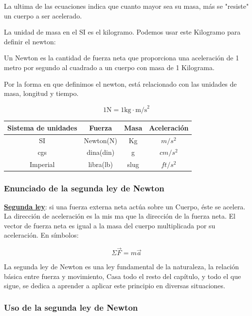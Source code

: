 \documentclass{article}
\newcommand{\newtitle}[1]{
    \color{titleColor}
    \subsubsection{#1}
    \color{black}
}
\newcommand{\bl}[1]{\textbf{#1}}
\newcommand{\definicion}[1]{%
    \vspace{0.5cm}
    \begin{definicionbox}
        #1
    \end{definicionbox}
    \vspace{0.5cm}
}
\begin{document}
    \par La ultima de las ecuaciones indica que cuanto mayor sea su masa, más se "resiste" un cuerpo a ser acelerado.
    \par La unidad de masa en el SI es el kilogramo. Podemos usar este Kilogramo para definir el newton:

    \definicion{
        \par Un Newton es la cantidad de fuerza neta que proporciona una aceleración de 1 metro por segundo al cuadrado a un cuerpo con masa de 1 Kilograma.
    }

    \par Por la forma en que definimos el newton, está relacionado con las unidades de masa, longitud y tiempo.

    \[ 1 \text{N} = 1 \text{kg} \cdot \text{m/s}^2 \]

    \begin{table}[H]
        \centering
        \begin{tabular}{|c|c|c|c|}
            \hline
            Sistema de unidades & Fuerza & Masa & Aceleración \\
            \hline
            SI & Newton(N) & Kg & $m/s^2$ \\
            \hline
            cgs & dina(din) & g & $cm/s^2$ \\
            \hline
            Imperial & libra(lb) & slug & $ft/s^2$ \\
            \hline
        \end{tabular}
    \end{table}

    \newtitle{Enunciado de la segunda ley de Newton}

    \definicion{
        \par \color{blue}\underline{\bl{Segunda ley}}\color{black}: si una fuerza externa neta actúa sobre un Cuerpo, éste se acelera. La dirección de aceleración es la mis ma que la dirección de la fuerza neta. El vector de fuerza neta es igual a la masa del cuerpo multiplicada por su aceleración. En símbolos: 

        \[\Sigma \vec{F} = m \vec{a}\]
    }

    \par La segunda ley de Newton es una ley fundamental de la naturaleza, la relación básica entre fuerza y movimiento, Casa todo el resto del capítulo, y todo el que sigue, se dedica a aprender a aplicar este principio en diversas situaciones.

    \newtitle{Uso de la segunda ley de Newton}
\end{document}
